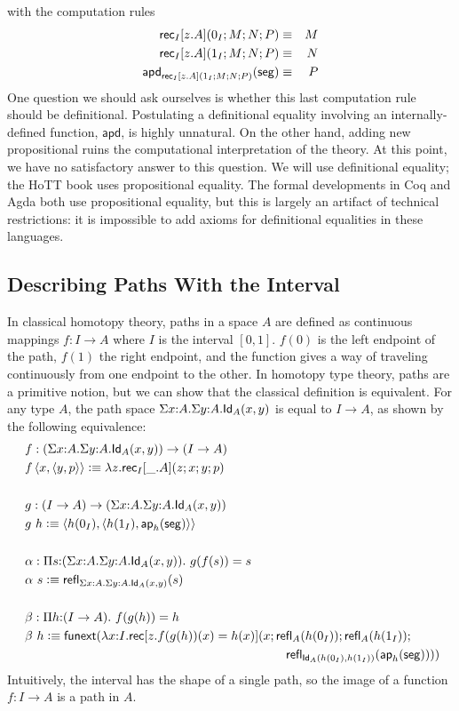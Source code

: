 \documentclass[11pt]{article}
\newcommand*{\Interval}{I}
\newcommand*{\Izero}{0_I}
\newcommand*{\Ione}{1_I}
\newcommand*{\Iseg}{\mathsf{seg}}
\newcommand*{\ap}{\mathsf{ap}}
\newcommand*{\apd}{\mathsf{apd}}
\newcommand*{\funext}{\mathsf{funext}}
\begin{document}
with the computation rules
\begin{eqnarray*}
  \rec_\Interval[z.A](\Izero;M;N;P) &\jdeq& M \\
  \rec_\Interval[z.A](\Ione;M;N;P) &\jdeq& N \\
  \apd_{\rec_\Interval[z.A](\Ione;M;N;P)}(\Iseg) &\jdeq& P
\end{eqnarray*}
One question we should ask ourselves is whether this last computation rule should be definitional. Postulating a definitional equality involving an internally-defined function, $\apd$, is highly unnatural. On the other hand, adding new propositional ruins the computational interpretation of the theory. At this point, we have no satisfactory answer to this question. We will use definitional equality; the HoTT book uses propositional equality. The formal developments in Coq and Agda both use propositional equality, but this is largely an artifact of technical restrictions: it is impossible to add axioms for definitional equalities in these languages.

\subsection*{Describing Paths With the Interval}

In classical homotopy theory, paths in a space $A$ are defined as continuous mappings $f : I \to A$ where $I$ is the interval $[0,1]$. $f(0)$ is the left endpoint of the path, $f(1)$ the right endpoint, and the function gives a way of traveling continuously from one endpoint to the other. In homotopy type theory, paths are a primitive notion, but we can show that the classical definition is equivalent. For any type $A$, the path space $\Sigma x{:}A. \Sigma y{:}A. \mathsf{Id}_{A}(x,y)$ is equal to $I \to A$, as shown by the following equivalence:
\begin{align*}
  & f : (\Sigma x{:}A. \Sigma y{:}A. \Id{A}(x,y)) \to (I \to A) \\
  & f \left<x,\left<y,p\right>\right> \defeq \lambda z. \rec_\Interval[\_.A](z;x;y;p) \\
  ~ \\
  & g : (I \to A) \to (\Sigma x{:}A.\Sigma y{:}A. \Id{A}(x,y)) \\
  & g~h \defeq \left< h(\Izero), \left<h(\Ione), \ap_h(\Iseg)\right> \right> \\
  ~ \\
  & \alpha : \Pi s{:} (\Sigma x{:}A.\Sigma y{:}A. \Id{A}(x,y)).~g(f(s)) = s \\
  & \alpha~s \defeq \refl{\Sigma x{:}A. \Sigma y{:}A. \Id{A}(x,y)}(s) \\ 
  ~ \\
  & \beta : \Pi h{:}(I \to A).~f(g(h)) = h \\
  & \beta~h \defeq \funext(\lambda x{:}I. \rec[z. f(g(h))(x) = h(x)](x; \refl{A}(h(\Izero)); \refl{A}(h(\Ione)); \\
  & \hspace{210pt} \refl{\Id{A}(h(\Izero),h(\Ione))}(\ap_h(\Iseg))))
\end{align*}
Intuitively, the interval has the shape of a single path, so the image of a function $f : I \to A$ is a path in $A$.
\end{document}
